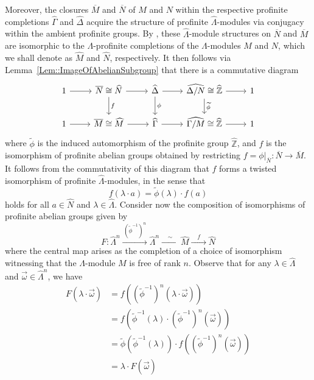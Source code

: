 \documentclass{amsart}
\numberwithin{theorem}{section}
\numberwithin{equation}{section}
\newcommand{\Z}{\mathbb{Z}}
\newcommand{\pZ}{\widehat{\Z}}
\newcommand{\hD}{\widehat{\Delta}}
\newcommand{\hG}{\widehat{\Gamma}}
\newcommand{\hM}{\widehat{M}}
\newcommand{\hN}{\widehat{N}}
\newcommand{\at}[1]{|_{#1}}
\begin{document}
Moreover, the closures $\overline{M}$ and $\overline{N}$ of $M$ and $N$ within the respective profinite completions $\hG$ and $\hD$ acquire the structure of profinite $\widehat{\Lambda}$-modules via conjugacy within the ambient profinite groups. By \cite[Lemma 5.2]{Wykowski2025_2}, these $\widehat{\Lambda}$-module structures on $\overline{N}$ and $\overline{M}$ are isomorphic to the $\Lambda$-profinite completions of the $\Lambda$-modules $M$ and $N$, which we shall denote as $\hM$ and $\hN$, respectively. It then follows via Lemma~\ref{Lem::ImageOfAbelianSubgroup} that there is a commutative diagram
\[
\begin{tikzcd}
1 \arrow[r] & \overline{N} \cong \hN \arrow[d, "f"] \arrow[r] & \widehat{\Delta} \arrow[d, "\phi"] \arrow[r] & \widehat{\Delta / N} \cong \pZ \arrow[d, "\widetilde{\phi}"] \arrow[r] & 1 \\
1 \arrow[r] & \overline{M} \cong \hM \arrow[r]           & \widehat{\Gamma} \arrow[r]                   & \widehat{\Gamma / M} \cong \pZ \arrow[r]           & 1
\end{tikzcd}
\]
where $\widetilde{\phi}$ is the induced automorphism of the profinite group $\pZ$, and $f$ is the isomorphism of profinite abelian groups obtained by restricting $f = \phi \at{\overline{N}} : \overline{N} \to \overline{M}$. It follows from the commutativity of this diagram that $f$ forms a twisted isomorphism of profinite $\widehat{\Lambda}$-modules, in the sense that
\begin{equation}
    f(\lambda \cdot a) = \widetilde{\phi}(\lambda) \cdot f(a)
\end{equation}
holds for all $a \in \hN$ and $\lambda \in \widehat{\Lambda}$. Consider now the composition of isomorphisms of profinite abelian groups given by 
\[
F \colon \widehat{\Lambda}^n \xrightarrow{\,(\widetilde{\phi}^{-1})^n\,} \widehat{\Lambda}^n \xrightarrow{\quad \sim\quad} \hM \xrightarrow{\quad f \quad} \hN
\]
where the central map arises as the completion of a choice of isomorphism witnessing that the $\Lambda$-module $M$ is free of rank $n$. Observe that for any $\lambda \in \widehat{\Lambda}$ and $\vec{\omega} \in \widehat{\Lambda}^n$, we have
\begin{align*}
    F(\lambda \cdot \vec{\omega}) &= f \left((\widetilde\phi^{-1})^n(\lambda \cdot \vec{\omega}) \right) \\
    &= f \left(\widetilde{\phi}^{-1}(\lambda)\cdot (\widetilde{\phi}^{-1})^n(\vec{\omega}) \right) \\
    &= \widetilde{\phi} \left(\widetilde{\phi}^{-1}(\lambda)\right) \cdot f \left((\widetilde{\phi}^{-1})^n(\vec{\omega}) \right) \\
    &= \lambda \cdot F(\vec{\omega})
\end{align*}
\end{document}
